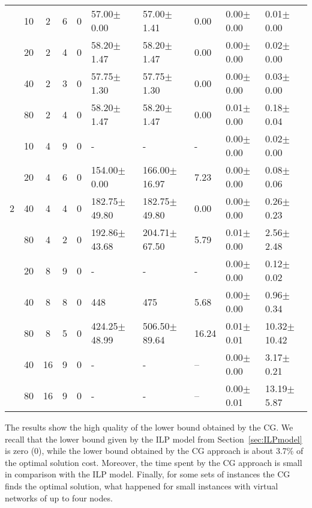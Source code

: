 \documentclass[article]{llncs}
\begin{document}
\begin{table}[h]
\begin{center}
\begin{tabular}{c c c| c c l l l l l}
\hline                                                                                          
&10 & 2    & 6 & 0 &  57.00$\pm$0.00        &  57.00$\pm$1.41     &   0.00      &  0.00$\pm$0.00 &  0.01$\pm$0.00        \\
&20 & 2    & 4 & 0 &  58.20$\pm$1.47        &  58.20$\pm$1.47     &   0.00      &  0.00$\pm$0.00 &  0.02$\pm$0.00        \\
&40 & 2    & 3 & 0 &  57.75$\pm$1.30        &  57.75$\pm$1.30     &   0.00      &  0.00$\pm$0.00 &  0.03$\pm$0.00        \\
&80 & 2    & 4 & 0 &  58.20$\pm$1.47        &  58.20$\pm$1.47     &   0.00      &  0.01$\pm$0.00 &  0.18$\pm$0.04        \\
&10 & 4    & 9 & 0 &  -                   &  -                    &   -         &  0.00$\pm$0.00 &  0.02$\pm$0.00        \\
&20 & 4    & 6 & 0 &  154.00$\pm$0.00       &  166.00$\pm$16.97   &   7.23      &  0.00$\pm$0.00 &  0.08$\pm$0.06        \\
2&40 & 4   & 4 & 0 &  182.75$\pm$49.80      &  182.75$\pm$49.80    &  0.00      &  0.00$\pm$0.00 &  0.26$\pm$0.23        \\
&80 & 4    & 2 & 0 &  192.86$\pm$43.68      &  204.71$\pm$67.50   &   5.79      &  0.01$\pm$0.00 &  2.56$\pm$2.48        \\
&20 & 8    & 9 & 0 &  -                     &  -                  &   -         &  0.00$\pm$0.00 &  0.12$\pm$0.02         \\
&40 & 8    & 8 & 0 &  448                   &  475                &  5.68       &  0.00$\pm$0.00 &  0.96$\pm$0.34        \\
&80 & 8    & 5 & 0 &  424.25$\pm$48.99      &  506.50$\pm$89.64   &  16.24      &  0.01$\pm$0.01 &  10.32$\pm$10.42       \\
&40 & 16   & 9 & 0 &  -                     &  -                  &  --         &  0.00$\pm$0.00 &  3.17$\pm$0.21         \\
&80 & 16   & 9 & 0 &  -                     &  -                  &  --         &  0.00$\pm$0.01 &  13.19$\pm$5.87        \\
\end{tabular}
\end{center}
\end{table}
The results show the high quality of the lower bound obtained by the CG. We recall that the lower bound given by the ILP model from Section~\ref{sec:ILPmodel} is zero (0),
while the lower bound obtained by the CG approach is about 3.7\% of the optimal solution cost.
Moreover, the time spent by the CG approach is small in comparison with the ILP model.
Finally, for some sets of instances the CG finds the optimal solution, what happened for small instances with virtual networks of up to four nodes.
\end{document}
